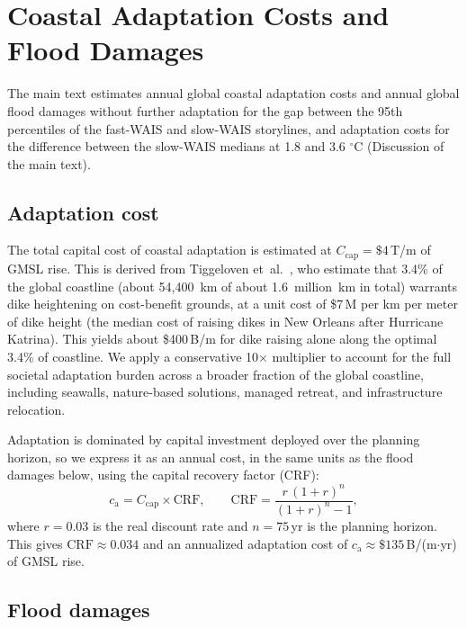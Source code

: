 \documentclass[12pt]{article}
\begin{document}
\section{Coastal Adaptation Costs and Flood Damages}
\label{sec:costs}

The main text estimates annual global coastal adaptation costs and annual global flood damages without further adaptation for the gap between the 95th percentiles of the fast-WAIS and slow-WAIS storylines, and adaptation costs for the difference between the slow-WAIS medians at 1.8 and 3.6 $^\circ$C (Discussion of the main text).

\subsection{Adaptation cost}
\label{s:adaptation_cost}

The total capital cost of coastal adaptation is estimated at $C_{\mathrm{cap}} = \$4$\,T/m of GMSL rise. This is derived from Tiggeloven et~al.~\citeyearpar{Tiggeloven2020}, who estimate that 3.4\% of the global coastline (about 54{,}400~km of about 1.6~million~km in total) warrants dike heightening on cost-benefit grounds, at a unit cost of \$7\,M per km per meter of dike height (the median cost of raising dikes in New Orleans after Hurricane Katrina). This yields about \$400\,B/m for dike raising alone along the optimal 3.4\% of coastline. We apply a conservative 10$\times$ multiplier to account for the full societal adaptation burden across a broader fraction of the global coastline, including seawalls, nature-based solutions, managed retreat, and infrastructure relocation.

Adaptation is dominated by capital investment deployed over the planning horizon, so we express it as an annual cost, in the same units as the flood damages below, using the capital recovery factor (CRF):
\begin{equation}
c_{\mathrm{a}} = C_{\mathrm{cap}} \times \mathrm{CRF}, \qquad \mathrm{CRF} = \frac{r\,(1+r)^n}{(1+r)^n - 1},
\label{eq:crf}
\end{equation}
where $r = 0.03$ is the real discount rate and $n = 75$\,yr is the planning horizon. This gives $\mathrm{CRF} \approx 0.034$ and an annualized adaptation cost of $c_{\mathrm{a}} \approx \$135$\,B/(m$\cdot$yr) of GMSL rise.

\subsection{Flood damages}
\end{document}
